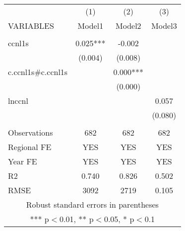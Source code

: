 \documentclass[]{article}
\begin{document}
\begin{tabular}{lccc} \hline
 & (1) & (2) & (3) \\
VARIABLES & Model1 & Model2 & Model3 \\ \hline
 &  &  &  \\
ccnl1s & 0.025*** & -0.002 &  \\
 & (0.004) & (0.008) &  \\
c.ccnl1s\#c.ccnl1s &  & 0.000*** &  \\
 &  & (0.000) &  \\
lnccnl &  &  & 0.057 \\
 &  &  & (0.080) \\
 &  &  &  \\
Observations & 682 & 682 & 682 \\
Regional FE & YES & YES & YES \\
Year FE & YES & YES & YES \\
R2 & 0.740 & 0.826 & 0.502 \\
 RMSE & 3092 & 2719 & 0.105 \\ \hline
\multicolumn{4}{c}{ Robust standard errors in parentheses} \\
\multicolumn{4}{c}{ *** p$<$0.01, ** p$<$0.05, * p$<$0.1} \\
\end{tabular}
\end{document}
